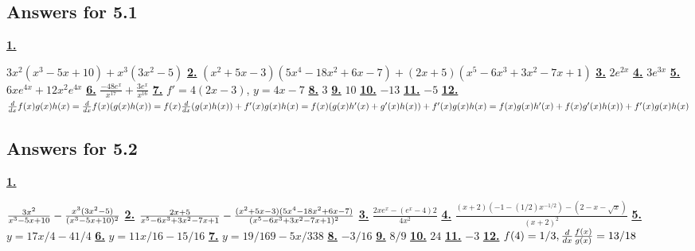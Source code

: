 \subsection *{Answers for 5.1}
\hypertarget {a:5.1.1}{\hyperlink {e:5.1.1}{\bfseries 1.}} \mdseries $3x^2(x^3-5x+10)+x^3(3x^2-5)$\qquad 
\hypertarget {a:5.1.2}{\hyperlink {e:5.1.2}{\bfseries 2.}} \mdseries $(x^2+5x-3)(5x^4-18x^2+6x-7)+(2x+5)(x^5-6x^3+3x^2-7x+1)$\qquad 
\hypertarget {a:5.1.3}{\hyperlink {e:5.1.3}{\bfseries 3.}} \mdseries $2e^{2x}$\qquad 
\hypertarget {a:5.1.4}{\hyperlink {e:5.1.4}{\bfseries 4.}} \mdseries $3e^{3x}$\qquad 
\hypertarget {a:5.1.5}{\hyperlink {e:5.1.5}{\bfseries 5.}} \mdseries $6xe^{4x}+12x^2e^{4x}$\qquad 
\hypertarget {a:5.1.6}{\hyperlink {e:5.1.6}{\bfseries 6.}} \mdseries $\frac {-48e^x}{x^{17}}+\frac {3e^x}{x^{16}}$\qquad 
\hypertarget {a:5.1.7}{\hyperlink {e:5.1.7}{\bfseries 7.}} \mdseries $f'=4(2x-3)$, $y=4x-7$\qquad 
\hypertarget {a:5.1.8}{\hyperlink {e:5.1.8}{\bfseries 8.}} \mdseries $3$\qquad 
\hypertarget {a:5.1.9}{\hyperlink {e:5.1.9}{\bfseries 9.}} \mdseries $10$\qquad 
\hypertarget {a:5.1.10}{\hyperlink {e:5.1.10}{\bfseries 10.}} \mdseries $-13$\qquad 
\hypertarget {a:5.1.11}{\hyperlink {e:5.1.11}{\bfseries 11.}} \mdseries $-5$\qquad 
\hypertarget {a:5.1.12}{\hyperlink {e:5.1.12}{\bfseries 12.}} \mdseries $\frac{d}{dx} f(x)g(x)h(x) = \frac{d}{dx} f(x)(g(x)h(x)) = f(x) \frac{d}{dx} (g(x) h(x)) + f'(x) g(x) h(x) = f(x) (g(x) h'(x)+ g'(x)h(x)) + f'(x) g(x) h(x) = f(x)g(x)h'(x)+ f(x) g'(x)h(x)) + f'(x) g(x) h(x)$\qquad 
\subsection *{Answers for 5.2}
\hypertarget {a:5.2.1}{\hyperlink {e:5.2.1}{\bfseries 1.}} \mdseries ${3x^2\over x^3-5x+10}-{x^3(3x^2-5)\over (x^3-5x+10)^2}$\qquad 
\hypertarget {a:5.2.2}{\hyperlink {e:5.2.2}{\bfseries 2.}} \mdseries ${2x+5\over x^5-6x^3+3x^2-7x+1}- {(x^2+5x-3)(5x^4-18x^2+6x-7)\over (x^5-6x^3+3x^2-7x+1)^2}$\qquad 
\hypertarget {a:5.2.3}{\hyperlink {e:5.2.3}{\bfseries 3.}} \mdseries $\frac {2xe^x-(e^x-4)2}{4x^2}$\qquad 
\hypertarget {a:5.2.4}{\hyperlink {e:5.2.4}{\bfseries 4.}} \mdseries $\frac {(x+2)(-1-(1/2)x^{-1/2}) - (2-x-\sqrt {x})}{(x+2)^2}$\qquad 
\hypertarget {a:5.2.5}{\hyperlink {e:5.2.5}{\bfseries 5.}} \mdseries $y=17x/4-41/4$\qquad 
\hypertarget {a:5.2.6}{\hyperlink {e:5.2.6}{\bfseries 6.}} \mdseries $y=11x/16-15/16$\qquad 
\hypertarget {a:5.2.7}{\hyperlink {e:5.2.7}{\bfseries 7.}} \mdseries $y=19/169-5x/338$\qquad 
\hypertarget {a:5.2.8}{\hyperlink {e:5.2.8}{\bfseries 8.}} \mdseries $-3/16$\qquad 
\hypertarget {a:5.2.9}{\hyperlink {e:5.2.9}{\bfseries 9.}} \mdseries $8/9$\qquad 
\hypertarget {a:5.2.10}{\hyperlink {e:5.2.10}{\bfseries 10.}} \mdseries $24$\qquad 
\hypertarget {a:5.2.11}{\hyperlink {e:5.2.11}{\bfseries 11.}} \mdseries $-3$\qquad 
\hypertarget {a:5.2.12}{\hyperlink {e:5.2.12}{\bfseries 12.}} \mdseries $f(4) = 1/3, \frac{d}{dx} \frac {f(x)}{g(x)} = 13/18$\qquad 
